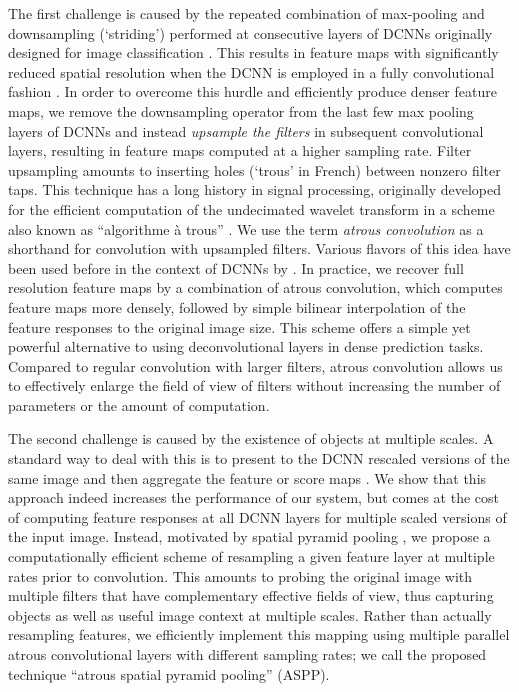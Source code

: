 \documentclass[10pt,journal,compsoc]{IEEEtran}
\begin{document}
The first challenge is caused by the repeated combination of max-pooling and downsampling (`striding')
 performed at consecutive layers of  DCNNs originally designed
for image classification \cite{KrizhevskyNIPS2013, simonyan2014very, szegedy2014going}.
This results in feature maps with significantly reduced spatial resolution when
the DCNN is employed in a fully convolutional fashion \cite{long2014fully}. In
order to overcome this hurdle and efficiently produce denser feature maps, we
remove the downsampling operator from the last few max pooling layers of DCNNs
and instead {\it upsample the filters} in subsequent convolutional layers, resulting
in feature maps computed at a higher sampling rate. Filter upsampling amounts to
inserting holes (`trous' in French) between nonzero filter taps. This technique has a long history in signal processing,
originally developed for the efficient computation of the undecimated wavelet
transform in a scheme also known as ``algorithme \`a trous''
\cite{holschneider1989real}. We use the term \emph{atrous convolution} as a shorthand for convolution with
upsampled filters. 
Various flavors of this idea have been used before
in the context of DCNNs by \cite{giusti2013fast, sermanet2013overfeat,
papandreou2014untangling}. In practice, we recover full resolution feature maps
by a combination of atrous convolution, which computes feature maps more
densely, followed by simple bilinear interpolation of the feature responses to
the original image size. This scheme offers a simple yet powerful alternative to
using deconvolutional layers \cite{zeiler2014visualizing, long2014fully} in
dense prediction tasks. Compared to regular convolution with larger filters, atrous
convolution allows us to effectively enlarge the field of view of filters without
increasing the number of parameters or the amount of computation.

The second challenge is caused by the existence of objects at
multiple scales. A standard way to deal with this is to present to the DCNN
rescaled versions of the same image and then aggregate the feature or score maps
\cite{papandreou2014untangling, chen2015attention,kokkinos2016pushing}. We show that this approach
indeed increases the performance of our system, but comes at the cost of computing feature
responses at all DCNN layers for multiple scaled versions of the input image. Instead, motivated
by  spatial pyramid pooling \cite{lazebnik2006beyond, he2014spatial},
we propose a computationally efficient scheme of resampling a given feature layer at multiple
rates prior to  convolution. This amounts to probing the original image with multiple filters
that have complementary effective fields of view, thus capturing objects as
well as useful image context at multiple scales. Rather than actually resampling features, 
we efficiently implement this mapping using
multiple parallel atrous convolutional layers with different sampling
rates; we call the proposed technique ``atrous spatial pyramid pooling'' (ASPP).
\end{document}
